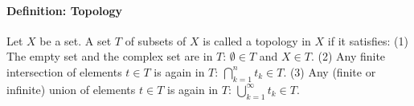 \paragraph{Definition: Topology} Let $X$ be a set. A set $T$ of subsets of $X$ is called a topology in $X$ if it satisfies: (1) The empty set and the complex set are in $T$: $\emptyset \in T$ and $X \in T$. (2) Any finite intersection of elements $t \in T$ is again in $T$: $\bigcap_{k=1}^n t_k \in T$. (3) Any (finite or infinite) union of elements $t \in T$ is again in $T$: $\bigcup_{k=1}^\infty t_k \in T$.






\begin{comment}

Zusammenhang zwischen normierten, metrischen und topologischen Räumen
https://www.youtube.com/watch?v=3j8GIJd5-3A&list=PLHi0WgifODX19zsJhvCrizYEXiHY5qc9n



\end{comment}
